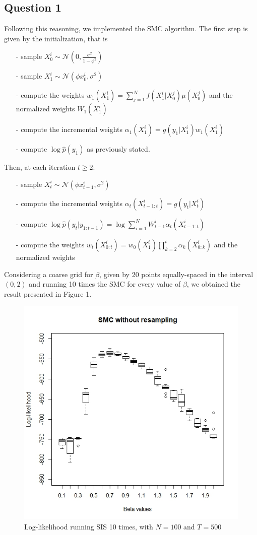 \documentclass[]{article}
\begin{document}
\subsection*{Question 1}
Following this reasoning, we implemented the SMC algorithm. The first step is given by the initialization, that is 
\begin{enumerate}
	\item[-] sample $X_0^i \sim \mathcal{N}(0, \frac{\sigma^2}{1-\phi^2})$
	\item[-] sample $X_1^i \sim \mathcal{N}(\phi x_0^i,\sigma^2) $ 
	\item[-] compute the weights $w_1(X_1^i) = \sum_{j=1}^{N}f(X_1^i|X_0^j)\mu(X_0^j)$ and the normalized weights $W_1(X_1^i)$
	\item[-] compute the incremental weights $ \alpha_1(X_1^i) = g(y_1|X_1^i)w_1(X_1^i) $
	\item[-] compute $\log \hat{p}(y_1)$ as previously stated. 
\end{enumerate}
Then, at each iteration $t \geq 2$:
\begin{enumerate}
	\item[-] sample $X_t^i \sim \mathcal{N}(\phi x_{t-1}^i,\sigma^2) $
	\item[-] compute the incremental weights $ \alpha_t(X_{t-1:t}^i) = g(y_t|X_t^i) $
	\item[-] compute $\log \hat{p}(y_t|y_{1:t-1})=\log\sum_{i=1}^{N}W_{t-1}^i\alpha_t(X_{t-1:t}^i)$
	\item[-] compute the weights $
	w_t(X_{0:t}^i)=w_0(X_1^i)\prod_{k=2}^{t}\alpha_k(X_{0:k}^i)$ and the normalized weights
\end{enumerate}
Considering a coarse grid for $\beta$, given by 20 points equally-spaced in the interval $(0,2)$ and running 10 times the SMC for every value of $\beta$, we obtained the result presented in Figure 1. 
\begin{figure}
	\includegraphics[width=\columnwidth]{task1/SIS_N_100_T_500.jpeg}
	\caption{Log-likelihood running SIS 10 times, with $N=100$ and $T=500$}
\end{figure}
\end{document}
